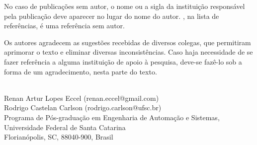 \documentclass{anpet}
\begin{document}
No caso de publicações sem autor, o nome ou a sigla da instituição responsável pela publicação deve aparecer no lugar do nome do autor. \textcite{GEIPOT1995}, na lista de referências, é uma referência sem autor.


\begin{acknowledgements}
Os autores agradecem as sugestões recebidas de diversos colegas, que permitiram aprimorar o texto e eliminar diversas inconsistências. Caso haja necessidade de se fazer referência a alguma instituição de apoio à pesquisa, deve-se fazê-lo sob a forma de um agradecimento, nesta parte do texto.
\end{acknowledgements}

\footnotesize
\printbibliography 

\vfill


\hrulefill\\
Renan Artur Lopes Eccel (renan.eccel@gmail.com) \\
Rodrigo Castelan Carlson (rodrigo.carlson@ufsc.br)\\
Programa de Pós-graduação em Engenharia de Automação e Sistemas, Universidade Federal de Santa Catarina\\
Florianópolis, SC, 88040-900, Brasil
\end{document}
